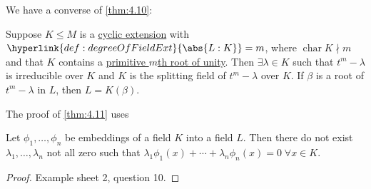 \documentclass{article}
\DeclareMathOperator{\chara}{char}
\begin{document}

We have a converse of \cref{thm:4.10}:
\begin{nthm}\label{thm:4.11}
    Suppose $K \leq M$ is a \hyperlink{def:cyclic}{cyclic extension} with $\hyperlink{def:degreeOfFieldExt}{\abs{L:K}} = m$, where $\chara K \nmid m$ and that $K$ contains a \hyperlink{def:primRoot}{primitive $m$th root of unity}.
    Then $\exists \lambda \in K$ such that $t^m - \lambda$ is irreducible over $K$ and $K$ is the splitting field of $t^m - \lambda$ over $K$.
    If $\beta$ is a root of $t^m - \lambda$ in $L$, then $L = K(\beta)$.
\end{nthm}


The proof of \cref{thm:4.11} uses
\begin{nlemma}\label{lem:4.13}
    Let $\phi_1, \dotsc, \phi_n$ be embeddings of a field $K$ into a field $L$.
    Then there do not exist $\lambda_1, \dotsc, \lambda_n$ not all zero such that $\lambda_1 \phi_1(x) + \dotsb + \lambda_n \phi_n(x) = 0 \; \forall x \in K$.
\end{nlemma}

\begin{proof}
    Example sheet 2, question 10.
\end{proof}
\end{document}
